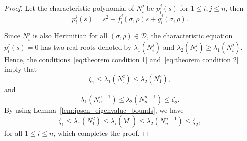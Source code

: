 \documentclass[]{IEEEtran}
\theoremstyle{definition}
\theoremstyle{remark}
\newcommand{\MC}[1]{\mathcal{#1}}
\begin{document}
\begin{proof}
	Let the characteristic polynomial of $N_i^j$ be $p_i^j(s)$ for $1 \le i, j
	\le n$, then
	\begin{equation*}
		p_i^j(s) = s^2 + f_i^j(\sigma, \rho) s + g_i^j(\sigma, \rho).
	\end{equation*}

	Since $N_i^j$ is also Herimitian for all $(\sigma, \rho) \in \MC{D}$,
	the characteristic equation $p_i^j(s) = 0$ has two real roots denoted by
	$\lambda_1(N_i^j)$ and $\lambda_2(N_i^j) \ge \lambda_1(N_i^j)$. Hence, the
	conditions~\eqref{eq:theorem condition 1} and~\eqref{eq:theorem condition 2}
	imply that
	\begin{equation*}
		\zeta_1 \le \lambda_1(N_1^2) \le \lambda_2(N_1^2),
	\end{equation*}
	and
	\begin{equation*}
		\lambda_1(N_n^{n-1}) \le \lambda_2(N_n^{n-1}) \le \zeta_2.
	\end{equation*}
	By using Lemma~\ref{lem:ipsen_eigenvalue_bounds}, we have
	\begin{equation*}
		\zeta_1 \le \lambda_1(N_1^2) \le \lambda_i(M^\prime) \le
		\lambda_2(N_n^{n-1}) \le \zeta_2,
	\end{equation*}
	for all $1 \le i \le n$, which completes the proof.
\end{proof}


\end{document}
